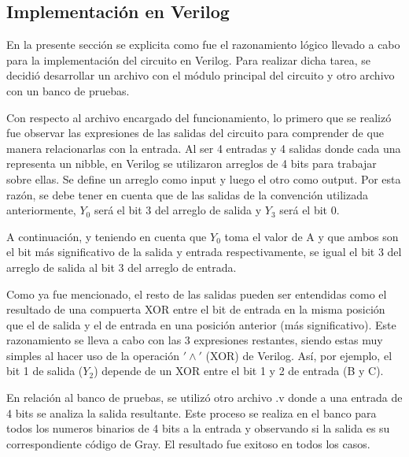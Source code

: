 \subsection{Implementaci\'on en Verilog}
\noindent
En la presente secci\'on se explicita como fue el razonamiento l\'ogico llevado a cabo para la implementaci\'on del circuito en Verilog. Para realizar dicha tarea, se decidi\'o desarrollar un archivo con el m\'odulo principal del circuito y otro archivo con un banco de pruebas.

\noindent
Con respecto al archivo encargado del funcionamiento, lo primero que se realiz\'o fue observar las expresiones de las salidas del circuito para comprender de que manera relacionarlas con la entrada. Al ser 4 entradas y 4 salidas donde cada una representa un nibble, en Verilog se utilizaron arreglos de 4 bits para trabajar sobre ellas. Se define un arreglo como input y luego el otro como output. Por esta raz\'on, se debe tener en cuenta que de las salidas de la convenci\'on utilizada anteriormente, $Y_0$ ser\'a el bit 3 del arreglo de salida y $Y_3$ ser\'a el bit 0.

\noindent
A continuaci\'on, y teniendo en cuenta que $Y_0$ toma el valor de A y que ambos son el bit m\'as significativo de la salida y entrada respectivamente, se igual el bit 3 del arreglo de salida al bit 3 del arreglo de entrada.

\noindent
Como ya fue mencionado, el resto de las salidas pueden ser entendidas como el resultado de una compuerta XOR entre el bit de entrada en la misma posici\'on que el de salida y el de entrada en una posici\'on anterior (m\'as significativo). Este razonamiento se lleva a cabo con las 3 expresiones restantes, siendo estas muy simples al hacer uso de la operaci\'on $'\wedge'$ (XOR) de Verilog. As\'i, por ejemplo, el bit 1 de salida ($Y_2$) depende de un XOR entre el bit 1 y 2 de entrada (B y C).

\noindent
En relaci\'on al banco de pruebas, se utiliz\'o otro archivo .v donde a una entrada de 4 bits se analiza la salida resultante. Este proceso se realiza en el banco para todos los numeros binarios de 4 bits a la entrada y observando si la salida es su correspondiente c\'odigo de Gray. El resultado fue exitoso en todos los casos.
